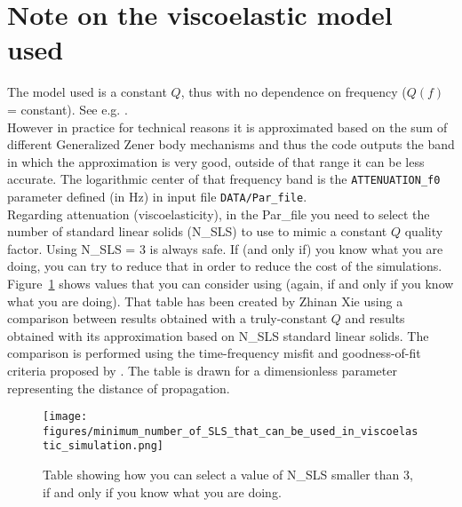 \section{Note on the viscoelastic model used}

\noindent
The model used is a constant $Q$, thus with no dependence on frequency ($Q(f)$ = constant).
See e.g. \cite{BlKoChLoXi16}. \\

\noindent
However in practice for technical reasons it is approximated based on the sum of different Generalized Zener body mechanisms
and thus the code outputs the band in which the approximation is very good, outside of that range it can be less accurate.
The logarithmic center of that frequency band is the \texttt{ATTENUATION\_f0} parameter defined (in Hz) in input file \texttt{DATA/Par\_file}. \\

\noindent
Regarding attenuation (viscoelasticity), in the Par\_file you need to select the number of standard linear solids (N\_SLS) to use to mimic a constant $Q$ quality factor.
Using N\_SLS = 3 is always safe. If (and only if) you know what you are doing, you can try to reduce that in order to reduce the cost of the simulations.
Figure~\ref{fig:selectNSLS} shows values that you can consider using (again, if and only if you know what you are doing). That table has been created by Zhinan Xie using
a comparison between results obtained with a truly-constant $Q$ and results obtained with its approximation based on N\_SLS standard linear solids.
The comparison is performed using the time-frequency misfit and goodness-of-fit criteria proposed by \cite{Kristekova_2009}.
The table is drawn for a dimensionless parameter representing the distance of propagation.
\begin{figure}[htbp]
\centering
\texttt{[image: figures/minimum\_number\_of\_SLS\_that\_can\_be\_used\_in\_viscoelastic\_simulation.png]}
\caption{Table showing how you can select a value of N\_SLS smaller than 3, if and only if you know what you are doing.}
\label{fig:selectNSLS}
\end{figure}

